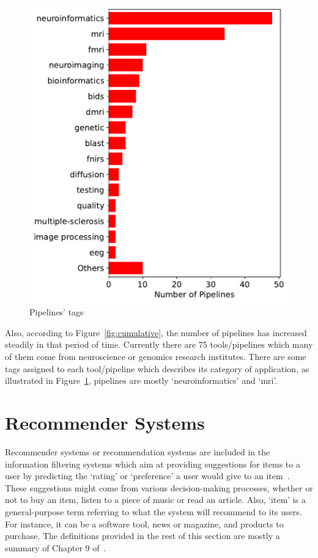 \begin{figure}
    \centering
    \includegraphics[width=\textwidth,height=\textheight,keepaspectratio]{figures/Pipelines Tag.pdf}
    \caption{Pipelines' tags}
    \label{fig:pipelineTags}
\end{figure}



Also, according to Figure~\ref{fig:cumulative}, the number of pipelines has increased steadily in that period of time. Currently there are 75 tools/pipelines which many of them come from neuroscience or genomics research institutes. There are some tags assigned to each tool/pipeline which describes its category of application, as illustrated in Figure~\ref{fig:pipelineTags}, pipelines are mostly `neuroinformatics' and `mri'.







\section{Recommender Systems}

Recommender systems or recommendation systems are included in the information filtering systems which aim at providing suggestions for items to a user by predicting the `rating' or `preference' a user would give to an item~\cite{isinkaye2015recommendation,ricci2011introduction}. These suggestions might come from various decision-making processes, whether or not to buy an item, listen to a piece of music or read an article. Also, `item' is a general-purpose term referring to what the system will recommend to its users. For instance, it can be a software tool, news or magazine, and products to purchase. The definitions provided in the rest of this section are mostly a summary of Chapter 9 of~\cite{rajaraman2011mining}.

